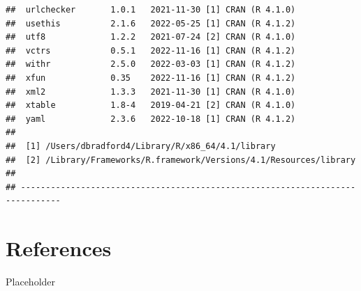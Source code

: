 \documentclass[print]{nuthesis}
\begin{document}
\begin{verbatim}
##  urlchecker       1.0.1   2021-11-30 [1] CRAN (R 4.1.0)
##  usethis          2.1.6   2022-05-25 [1] CRAN (R 4.1.2)
##  utf8             1.2.2   2021-07-24 [2] CRAN (R 4.1.0)
##  vctrs            0.5.1   2022-11-16 [1] CRAN (R 4.1.2)
##  withr            2.5.0   2022-03-03 [1] CRAN (R 4.1.2)
##  xfun             0.35    2022-11-16 [1] CRAN (R 4.1.2)
##  xml2             1.3.3   2021-11-30 [1] CRAN (R 4.1.0)
##  xtable           1.8-4   2019-04-21 [2] CRAN (R 4.1.0)
##  yaml             2.3.6   2022-10-18 [1] CRAN (R 4.1.2)
## 
##  [1] /Users/dbradford4/Library/R/x86_64/4.1/library
##  [2] /Library/Frameworks/R.framework/Versions/4.1/Resources/library
## 
## ------------------------------------------------------------------------------
\end{verbatim}

\hypertarget{references}{%
\chapter*{References}\label{references}}

Placeholder
\end{document}
